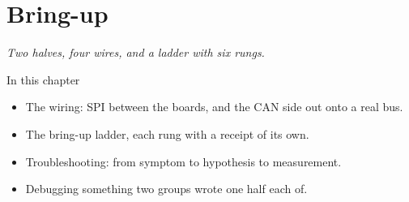 \chapter{Bring-up}
\label{ch:bringup}


{\large\itshape Two halves, four wires, and a ladder with six rungs.\par}

\begin{chapterbox}{In this chapter}
\begin{itemize}
  \item The wiring: SPI between the boards, and the CAN side out onto a real bus.
  \item The bring-up ladder, each rung with a receipt of its own.
  \item Troubleshooting: from symptom to hypothesis to measurement.
  \item Debugging something two groups wrote one half each of.
\end{itemize}
\end{chapterbox}




